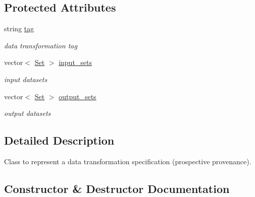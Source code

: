 \subsection*{Protected Attributes}
\begin{DoxyCompactItemize}
\item 
\mbox{\label{classTransformation_aae5fa5db90050f8bd2f24cce6864fb14}} 
string \hyperlink{classTransformation_aae5fa5db90050f8bd2f24cce6864fb14}{tag}
\begin{DoxyCompactList}\small\item\em data transformation tag \end{DoxyCompactList}\item 
\mbox{\label{classTransformation_a5cff8880aed2eaf0ad3bdc9ad1c86148}} 
vector$<$ \hyperlink{classSet}{Set} $>$ \hyperlink{classTransformation_a5cff8880aed2eaf0ad3bdc9ad1c86148}{input\+\_\+sets}
\begin{DoxyCompactList}\small\item\em input datasets \end{DoxyCompactList}\item 
\mbox{\label{classTransformation_ac1a61ff0d71f8ceb2d4338d2abd04f24}} 
vector$<$ \hyperlink{classSet}{Set} $>$ \hyperlink{classTransformation_ac1a61ff0d71f8ceb2d4338d2abd04f24}{output\+\_\+sets}
\begin{DoxyCompactList}\small\item\em output datasets \end{DoxyCompactList}\end{DoxyCompactItemize}


\subsection{Detailed Description}
Class to represent a data transformation specification (prospective provenance). 

\subsection{Constructor \& Destructor Documentation}
\mbox{\label{classTransformation_a7d309ec7b7e612c941982b0b3a484f70}} 
